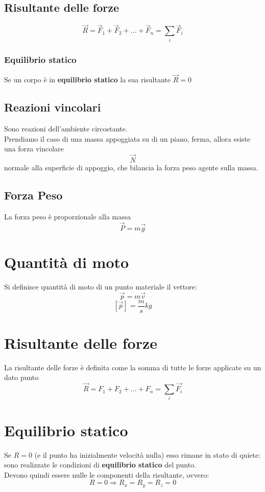 \documentclass[a4paper]{report}
\begin{document}
  \subsection{Risultante delle forze}
  \[ \vec{R} = \vec{F}_1 + \vec{F}_2 + ... +\vec{F}_n = \sum_i \vec{F}_i \]

  \subsubsection{Equilibrio statico}
  Se un corpo è in \textbf{equilibrio statico} la sua risultante $\vec{R} = 0$

  \subsection{Reazioni vincolari}
  Sono reazioni dell'ambiente circostante.\\
  Prendiamo il caso di una massa appoggiata su di un piano, ferma, allora esiste una forza vincolare
  \[ \vec{N} \]
  normale alla superficie di appoggio, che bilancia la forza peso agente sulla massa.

  \subsection{Forza Peso}
  La forza peso è proporzionale alla massa
  \[ \vec{P} = m\vec{g} \]

  \section{Quantità di moto}
  Si definisce quantità di moto di un punto materiale il vettore:
  \[ \vec{p} = m \vec{v} \]
  \[ [\vec{p}] = \frac{m}{s} kg \]

  \section{Risultante delle forze}
  La risultante delle forze è definita come la somma di tutte le forze applicate su un dato punto
  \[ \vec{R} = F_1 + F_2 + ... + F_n = \sum_{i} \vec{F_i} \]

  \section{Equilibrio statico}
  Se $R = 0$ (e il punto ha inizialmente velocità nulla) esso rimane in stato di quiete: sono realizzate le condizioni di \textbf{equilibrio statico} del punto.\\
  Devono quindi essere nulle le componenti della risultante, ovvero:
  \[ R = 0 \Rightarrow R_x = R_y = R_z = 0 \]
\end{document}
